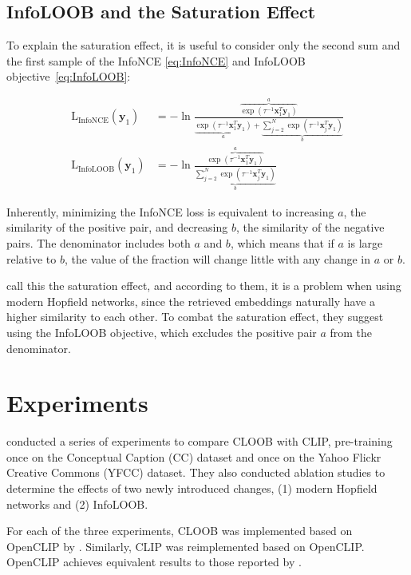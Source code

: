 \documentclass{scrarticle}
\begin{document}
\subsection{InfoLOOB and the Saturation Effect}

To explain the saturation effect, it is useful to consider only the second sum and the first sample of the InfoNCE \eqref{eq:InfoNCE} and InfoLOOB objective~\ref{eq:InfoLOOB}:

\begin{align}
\operatorname{L_{InfoNCE}}(\mathbf{y}_1)
&= -\ln\frac{\overbrace{\exp(\tau^{-1} \mathbf{x}_1^T \mathbf{y}_1)}^{a}}{\underbrace{\exp(\tau^{-1}\mathbf{x}_1^T \mathbf{y}_1)}_{a} + \underbrace{\textstyle\sum_{j=2}^{N} \exp(\tau^{-1} \mathbf{x}_j^T \mathbf{y}_ 1)}_{b}} \\
\operatorname{L_{InfoLOOB}}(\mathbf{y}_1)
&= -\ln\frac{\overbrace{\exp(\tau^{-1} \mathbf{x}_1^T \mathbf{y}_1)}^{a}}{\underbrace{\textstyle\sum_{j=2}^{N} \exp(\tau^{-1} \mathbf{x}_j^T \mathbf{y}_ 1)}_{b}}
\end{align}

Inherently, minimizing the InfoNCE loss is equivalent to increasing $a$, the similarity of the positive pair, and decreasing $b$, the similarity of the negative pairs. The denominator includes both $a$ and $b$, which means that if $a$ is large relative to $b$, the value of the fraction will change little with any change in $a$ or $b$.

\citet{cloob} call this the saturation effect, and according to them, it is a problem when using modern Hopfield networks, since the retrieved embeddings naturally have a higher similarity to each other. To combat the saturation effect, they suggest using the InfoLOOB objective, which excludes the positive pair $a$ from the denominator.

\section{Experiments}

\citet{cloob} conducted a series of experiments to compare CLOOB with CLIP, pre-training once on the Conceptual Caption (CC) dataset and once on the Yahoo Flickr Creative Commons (YFCC) dataset. They also conducted ablation studies to determine the effects of two newly introduced changes, (1) modern Hopfield networks and (2) InfoLOOB.

For each of the three experiments, CLOOB was implemented based on OpenCLIP by \citet{open_clip}. Similarly, CLIP was reimplemented based on OpenCLIP. OpenCLIP achieves equivalent results to those reported by \citet{clip}.
\end{document}
